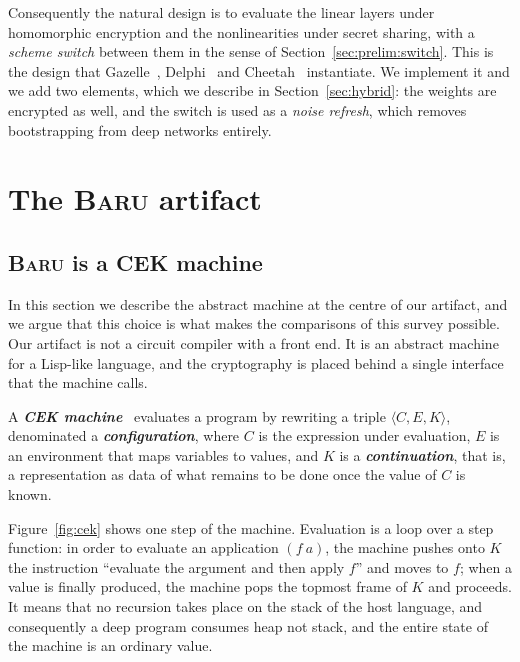 \documentclass[11pt]{article}
\newcommand{\ib}[1]{\textbf{\emph{#1}}}
\newcommand{\Baru}{\textsc{Baru}}
\begin{document}
Consequently the natural design is to evaluate the linear layers under homomorphic
encryption and the nonlinearities under secret sharing, with a \emph{scheme switch} between
them in the sense of Section~\ref{sec:prelim:switch}. This is the design that
Gazelle~\cite{Gazelle}, Delphi~\cite{Delphi} and Cheetah~\cite{Cheetah} instantiate. We
implement it and we add two elements, which we describe in Section~\ref{sec:hybrid}: the
weights are encrypted as well, and the switch is used as a \emph{noise refresh}, which
removes bootstrapping from deep networks entirely.

\section{The \texorpdfstring{\protect\normalfont\scshape Baru}{Baru} artifact}
\label{sec:artifact}

\subsection{\texorpdfstring{\protect\Baru{}}{Baru} is a CEK machine}
\label{sec:cek}

In this section we describe the abstract machine at the centre of our artifact, and we argue
that this choice is what makes the comparisons of this survey possible. Our artifact is not a
circuit compiler with a front end. It is an abstract machine for a Lisp-like language, and the
cryptography is placed behind a single interface that the machine calls.

\begin{definition}
\label{def:cek}
A \ib{CEK machine}~\cite{FelleisenFriedman} evaluates a program by rewriting a triple
$\langle C, E, K \rangle$, denominated a \ib{configuration}, where $C$ is the expression under
evaluation, $E$ is an environment that maps variables to values, and $K$ is a
\ib{continuation}, that is, a representation as data of what remains to be done once the value
of $C$ is known.
\end{definition}

Figure~\ref{fig:cek} shows one step of the machine. Evaluation is a loop over a step
function: in order to evaluate an application $(f\ a)$, the machine pushes onto $K$ the
instruction ``evaluate the argument and then apply $f$'' and moves to $f$; when a value is
finally produced, the machine pops the topmost frame of $K$ and proceeds. It means that no
recursion takes place on the stack of the host language, and consequently a deep program
consumes heap not stack, and the entire state of the machine is an ordinary value.
\end{document}
